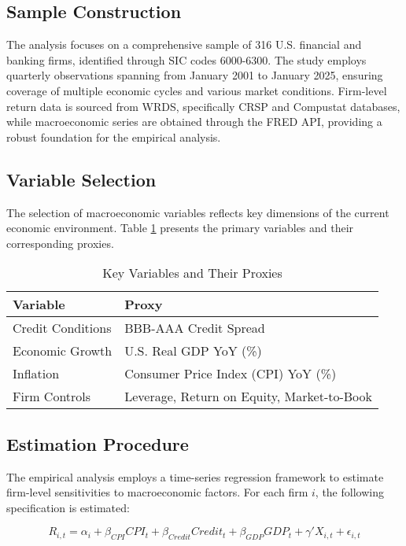 \documentclass[12pt]{article}
\begin{document}
\subsection{Sample Construction}

The analysis focuses on a comprehensive sample of 316 U.S. financial and banking firms, identified through SIC codes 6000-6300. The study employs quarterly observations spanning from January 2001 to January 2025, ensuring coverage of multiple economic cycles and various market conditions. Firm-level return data is sourced from WRDS, specifically CRSP and Compustat databases, while macroeconomic series are obtained through the FRED API, providing a robust foundation for the empirical analysis.

\subsection{Variable Selection}

The selection of macroeconomic variables reflects key dimensions of the current economic environment. Table \ref{tab:variables} presents the primary variables and their corresponding proxies.

\begin{table}[H]
    \centering
    \begin{tabular}{ll}
        \toprule
        Variable & Proxy \\
        \midrule
        Credit Conditions & BBB-AAA Credit Spread \\
        Economic Growth & U.S. Real GDP YoY (\%) \\
        Inflation & Consumer Price Index (CPI) YoY (\%) \\
        Firm Controls & Leverage, Return on Equity, Market-to-Book \\
        \bottomrule
    \end{tabular}
    \caption{Key Variables and Their Proxies}
    \label{tab:variables}
\end{table}

\subsection{Estimation Procedure}

The empirical analysis employs a time-series regression framework to estimate firm-level sensitivities to macroeconomic factors. For each firm $i$, the following specification is estimated:

\begin{equation}
    R_{i,t} = \alpha_i + \beta_{CPI}CPI_t + \beta_{Credit}Credit_t + \beta_{GDP}GDP_t + \gamma'X_{i,t} + \epsilon_{i,t}
\end{equation}
\end{document}
